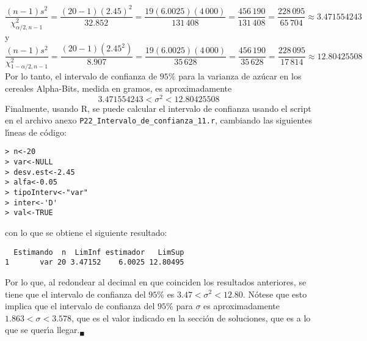 \begin{solucion}
 \begin{equation*}
  \frac{(n-1)s^2}{\chi^2_{\alpha/2,n-1}} = \frac{(20-1)(2.45)^2}{32.852} = \frac{19(6.0025)(4\,000)}{131\,408} = \frac{456\,190}{131\,408} = \frac{228\,095}{65\,704} \approx 3.471554243
 \end{equation*}
 y
 \begin{equation*}
  \frac{(n-1)s^2}{\chi^2_{1-\alpha/2,n-1}} = \frac{(20-1)(2.45^2)}{8.907} = \frac{19(6.0025)(4\,000)}{35\,628} = \frac{456\,190}{35\,628} = \frac{228\,095}{17\,814} \approx 12.80425508
 \end{equation*}
 Por lo tanto, el intervalo de confianza de $95\%$ para la varianza de az\'ucar en los cereales Alpha-Bits, medida en gramos, es aproximadamente
 \begin{equation*}
  3.471554243 < \sigma^2 < 12.80425508
 \end{equation*}
 Finalmente, usando R, se puede calcular el intervalo de confianza usando el script en el archivo anexo \texttt{P22\_Intervalo\_de\_confianza\_11.r}, cambiando las siguientes l\'{\i}neas de c\'odigo:
 \begin{verbatim}
> n<-20
> var<-NULL
> desv.est<-2.45
> alfa<-0.05
> tipoInterv<-"var"
> inter<-'D'
> val<-TRUE
 \end{verbatim}
 \vspace{-0.5cm}
 con lo que se obtiene el siguiente resultado:
 \begin{verbatim}
  Estimando  n  LimInf estimador   LimSup
1       var 20 3.47152    6.0025 12.80495
 \end{verbatim}
 \vspace{-0.5cm}
 Por lo que, al redondear al decimal en que coinciden los resultados anteriores, se tiene que el intervalo de confianza del $95\%$ es $3.47 < \sigma^2 < 12.80$. N\'otese que esto implica que el intervalo de confianza del $95\%$ para $\sigma$ es aproximadamente $1.863 < \sigma < 3.578$, que es el valor indicado en la secci\'on de soluciones, que es a lo que se quer\'{\i}a llegar.${}_{\blacksquare}$
\end{solucion}
